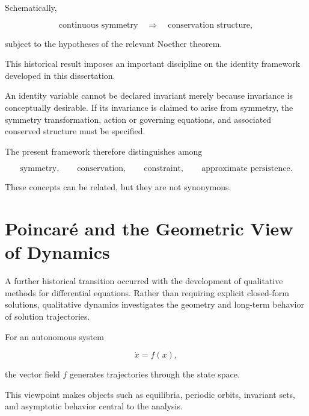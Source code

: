 \documentclass[12pt,oneside]{book}
\begin{document}
Schematically,

\begin{equation}
    \text{continuous symmetry}
    \quad\Longrightarrow\quad
    \text{conservation structure},
    \label{eq:noether-schematic}
\end{equation}

subject to the hypotheses of the relevant Noether theorem.

This historical result imposes an important discipline on the
identity framework developed in this dissertation.

An identity variable cannot be declared invariant merely
because invariance is conceptually desirable. If its invariance
is claimed to arise from symmetry, the symmetry transformation,
action or governing equations, and associated conserved
structure must be specified.

The present framework therefore distinguishes among

\begin{equation}
    \text{symmetry},
    \qquad
    \text{conservation},
    \qquad
    \text{constraint},
    \qquad
    \text{approximate persistence}.
\end{equation}

These concepts can be related, but they are not synonymous.


\section{Poincaré and the Geometric View of Dynamics}
\label{sec:poincare-dynamics}

A further historical transition occurred with the development
of qualitative methods for differential equations. Rather than
requiring explicit closed-form solutions, qualitative dynamics
investigates the geometry and long-term behavior of solution
trajectories.

For an autonomous system

\begin{equation}
    \dot{x}
    =
    f(x),
    \label{eq:autonomous-system}
\end{equation}

the vector field \(f\) generates trajectories through the state
space.

This viewpoint makes objects such as equilibria, periodic
orbits, invariant sets, and asymptotic behavior central to the
analysis.
\end{document}
